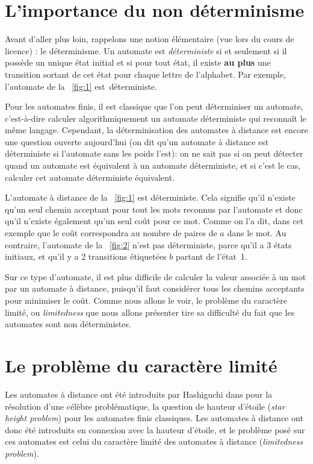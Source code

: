 \documentclass[12pt]{memoir}
\begin{document}
\section{L'importance du non déterminisme}


Avant d'aller plus loin, rappelons une notion élémentaire (vue
lors du cours de licence) : le
déterminisme. Un automate est \emph{déterministe} si et seulement si il possède un
unique état initial et si pour tout état, il existe \textbf{au plus} une
transition sortant de cet état pour chaque lettre de l'alphabet. Par
exemple, l'automate de la \figurename~\ref{fig:1} est~déterministe.

Pour les automates finis, il est classique que l'on peut déterminiser un
automate, c'est-à-dire calculer algorithmiquement un automate déterministe qui reconnaît le même
langage. Cependant, la déterminisation des automates à distance est encore une
question ouverte aujourd'hui (on dit qu'un automate à distance est
déterministe si l’automate sans les poids l'est): on ne sait
pas si on peut détecter quand un automate est équivalent à un automate
déterministe, et si c'est le cas, calculer cet automate déterministe équivalent.

L'automate à distance de la \figurename~\ref{fig:1}  est déterministe. Cela
signifie qu'il n'existe qu'un seul chemin acceptant pour tout les mots
reconnus par l'automate et donc qu'il n'existe également qu'un seul coût pour
ce mot. Comme on l'a dit, dans cet exemple que le coût correspondra au nombre
de paires de $a$ dans le mot. Au contraire, l'automate de la
\figurename~\ref{fig:2} n'est pas déterministe, parce qu'il a 3 états
initiaux, et qu'il y a 2 transitions étiquetées $b$ partant de l'état~1. 

Sur ce type d'automate, il est plus difficile de calculer la valeur associée à
un mot par un automate à distance, puisqu'il faut considérer tous les chemins
acceptants pour minimiser le coût. Comme nous allons le voir, le problème du caractère limité, ou
\emph{limitedness} que nous allons présenter tire sa difficulté du fait que
les automates sont non déterministes.

\section{Le problème du caractère limité}

Les automates à distance ont été introduits par Hashiguchi dans
\cite{Hashiguchi:Limitedness-theorem-on-finite-automata-with-distance-functions:1982:a}
pour la résolution d'une célèbre problématique, la question de hauteur
d'étoile (\emph{star height problem})
\cite{Eggan:Transition-graphs-and-the-star-height-of-regular-events:1963:a}
pour les automates finis classiques. Les
automates à distance ont donc été introduits en connexion avec la hauteur d'étoile,
et le problème posé sur ces automates est celui du caractère limité des
automates à distance (\emph{limitedness problem}).
\end{document}

